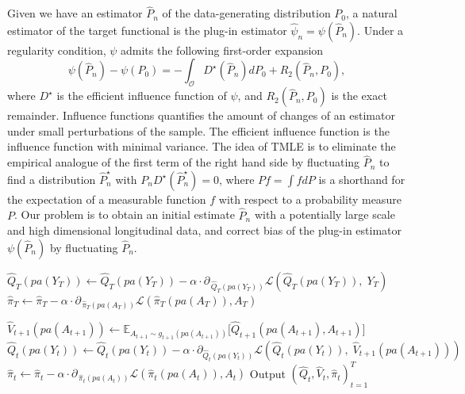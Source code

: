 \documentclass{article}
\theoremstyle{plain}
\theoremstyle{definition}
\theoremstyle{remark}
\begin{document}
Given we have an estimator $\hat{P}_n$ of the data-generating distribution $P_0$, a natural estimator of the target functional is the plug-in estimator $\hat{\psi}_n=\psi(\hat{P}_n)$. Under a regularity condition, $\psi$ admits the following first-order expansion
\begin{equation}
    \psi(\hat{P}_n)-\psi(P_0)=-\int_{\mathcal{O}}D^\star(\hat{P}_n)dP_0 + R_2(\hat{P}_n,P_0),
\end{equation}
where $D^\star$ is the efficient influence function of $\psi$, and $R_2(\hat{P}_n,P_0)$ is the exact remainder. Influence functions quantifies the amount of changes of an estimator under small perturbations of the sample. The efficient influence function is the influence function with minimal variance. The idea of TMLE is to eliminate the empirical analogue of the first term of the right hand side by fluctuating $\hat{P}_n$ to find a distribution $\hat{P}^\star_n$ with $P_nD^\star(\hat{P}^\star_n)=0$, where $Pf=\int fdP$ is a shorthand for the expectation of a measurable function $f$ with respect to a probability measure $P$. Our problem is to obtain an initial estimate $\hat{P}_n$ with a potentially large scale and high dimensional longitudinal data, and correct bias of the plug-in estimator $\psi(\hat{P}_n)$ by fluctuating $\hat{P}_n$. 

\begin{algorithm*}[tb]
   \caption{Temporal Difference Learning of Conditional Counterfactual Mean Outcomes}
   \label{alg:td-learning}
\begin{algorithmic}[1]
       \STATE $\hat{Q}_T(pa(Y_T)) \leftarrow \hat{Q}_T(pa(Y_T)) - \alpha \cdot \partial_{\, \hat{Q}_T(pa(Y_T))}{\mathcal{L}(\hat{Q}_T(pa(Y_T)), \; Y_T )}$
       \STATE $\hat{\pi}_T\leftarrow \hat{\pi}_T- \alpha \cdot \partial_{\, \hat{\pi}_T(pa(A_T))}{\mathcal{L}(\hat{\pi}_T(pa(A_T)), A_T)}$
       
       \STATE $\hat{V}_{t+1}(pa(A_{t+1})) \leftarrow \mathbb E_{A_{t+1} \sim g_{t+1}(pa(A_{t+1}))} \big[\hat{Q}_{t+1}(pa(A_{t+1}), A_{t+1})\big]$
       \STATE $\hat{Q}_{t}(pa(Y_t)) \leftarrow \hat{Q}_{t}(pa(Y_t)) - \alpha \cdot \partial_{\hat{Q}_{t}(pa(Y_t))} \mathcal{L}(\hat{Q}_{t}(pa(Y_t)), \; \hat{V}_{t+1}(pa(A_{t+1})) )$
       \STATE  $\hat{\pi}_t\leftarrow \hat{\pi}_t- \alpha \cdot \partial_{\, \hat{\pi}_t(pa(A_t))}{\mathcal{L}(\hat{\pi}_t(pa(A_t)), A_{t})}$
       \ENDFOR
   \ENDFOR
   \STATE Output $(\hat{Q}_t, \hat{V}_t, \hat{\pi}_t)_{t=1}^T$
\end{algorithmic}
\end{algorithm*}
\end{document}
